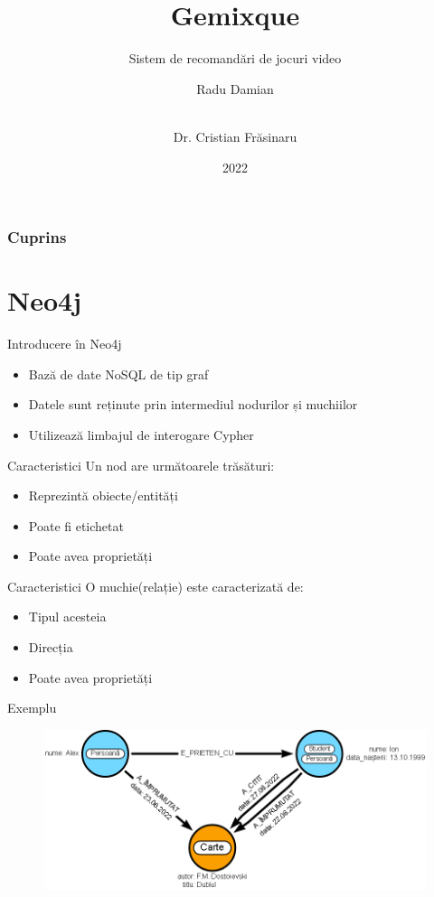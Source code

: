 \documentclass{beamer}
\title[Gemixque - sistem de recomandări de jocuri video]{Gemixque}
\subtitle{Sistem de recomandări de jocuri video}
\author[Radu Damian]{Radu Damian \and \\[9mm] Dr. Cristian Frăsinaru}
\institute{Facultatea de Informatică}
\date{2022}
\begin{document}
\frame{\titlepage}


\begin{frame}
  \frametitle{Cuprins}
  \tableofcontents
\end{frame}


\section{Neo4j}
\frame{\tableofcontents[currentsection]}
\begin{frame}{Introducere în Neo4j}
    \begin{itemize}
        \item Bază de date NoSQL de tip graf
        \item Datele sunt reținute prin intermediul nodurilor și muchiilor
        \item Utilizează limbajul de interogare Cypher
    \end{itemize}
\end{frame}

\begin{frame}{Caracteristici}
    Un nod are următoarele trăsături:
    
    \begin{itemize}
        \item Reprezintă obiecte/entități
        \item Poate fi etichetat
        \item Poate avea proprietăți
    \end{itemize}
    
    
\end{frame}

\begin{frame}{Caracteristici}
    O muchie(relație) este caracterizată de:
    
    \begin{itemize}
        \item Tipul acesteia
        \item Direcția
        \item Poate avea proprietăți
    \end{itemize}
\end{frame}

\begin{frame}[fragile]{Exemplu}
    \begin{figure}[H]
        \centering
        \begin{adjustbox}{max size={\textwidth}{\textheight}}
        \includegraphics[scale = 0.4]{exemplu_1}
        \end{adjustbox}
    \end{figure}
\end{frame}
\end{document}
